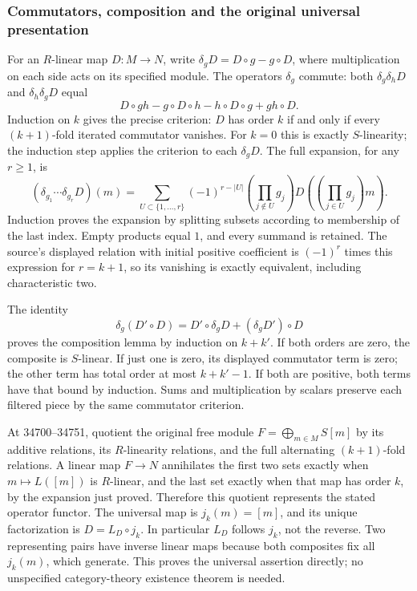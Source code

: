 \subsubsection{Commutators, composition and the original universal presentation}\label{algebra-proof-043-commutators-composition-and-the-original-universal-presentation}

For an \(R\)-linear map \(D:M\to N\), write \(\delta_gD=D\circ g-g\circ D\), where multiplication on each side acts on its specified module. The operators \(\delta_g\) commute: both \(\delta_g\delta_hD\) and \(\delta_h\delta_gD\) equal \[
D\circ gh-g\circ D\circ h-h\circ D\circ g+gh\circ D.
\] Induction on \(k\) gives the precise criterion: \(D\) has order \(k\) if and only if every \((k+1)\)-fold iterated commutator vanishes. For \(k=0\) this is exactly \(S\)-linearity; the induction step applies the criterion to each \(\delta_gD\). The full expansion, for any \(r\ge1\), is \[
(\delta_{g_1}\cdots\delta_{g_r}D)(m)
=\sum_{U\subset\{1,\ldots,r\}}(-1)^{r-|U|}
\left(\prod_{j\notin U}g_j\right)
D\left(\left(\prod_{j\in U}g_j\right)m\right).
\] Induction proves the expansion by splitting subsets according to membership of the last index. Empty products equal \(1\), and every summand is retained. The source's displayed relation with initial positive coefficient is \((-1)^r\) times this expression for \(r=k+1\), so its vanishing is exactly equivalent, including characteristic two.

The identity \[
\delta_g(D'\circ D)=D'\circ\delta_gD+(\delta_gD')\circ D
\] proves the composition lemma by induction on \(k+k'\). If both orders are zero, the composite is \(S\)-linear. If just one is zero, its displayed commutator term is zero; the other term has total order at most \(k+k'-1\). If both are positive, both terms have that bound by induction. Sums and multiplication by scalars preserve each filtered piece by the same commutator criterion.

At 34700--34751, quotient the original free module \(F=\bigoplus_{m\in M}S[m]\) by its additive relations, its \(R\)-linearity relations, and the full alternating \((k+1)\)-fold relations. A linear map \(F\to N\) annihilates the first two sets exactly when \(m\mapsto L([m])\) is \(R\)-linear, and the last set exactly when that map has order \(k\), by the expansion just proved. Therefore this quotient represents the stated operator functor. The universal map is \(j_k(m)=[m]\), and its unique factorization is \(D=L_D\circ j_k\). In particular \(L_D\) follows \(j_k\), not the reverse. Two representing pairs have inverse linear maps because both composites fix all \(j_k(m)\), which generate. This proves the universal assertion directly; no unspecified category-theory existence theorem is needed.

